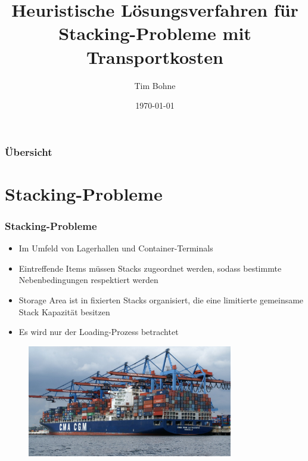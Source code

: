 \documentclass{beamer}
\title[]{Heuristische Lösungsverfahren für Stacking-Probleme mit Transportkosten}
\author{Tim Bohne}
\institute[]
{
\textit{AG Kombinatorische Optimierung}
\medskip
}
\date{\today}
\begin{document}
\begin{frame}[plain] %
\titlepage %
\end{frame}

\begin{frame}
\frametitle{Übersicht} %
\tableofcontents
\end{frame}

\section{Stacking-Probleme}

\begin{frame}
\frametitle{Stacking-Probleme}
\begin{itemize}
\item Im Umfeld von Lagerhallen und Container-Terminals
\item Eintreffende Items müssen Stacks zugeordnet werden, sodass bestimmte Nebenbedingungen respektiert werden
\item Storage Area ist in fixierten Stacks organisiert, die eine limitierte gemeinsame Stack Kapazität besitzen
\item Es wird nur der Loading-Prozess betrachtet
\end{itemize}
\begin{figure}
\centering
\includegraphics[width=0.8\textwidth]{images/t5.png}
\end{figure}
\end{frame}
\end{document}
